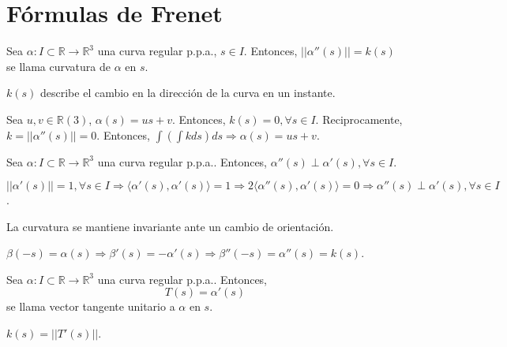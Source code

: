 \section{Fórmulas de Frenet}

\begin{defn}[Curvatura]
  Sea $\alpha : I \subset \mathbb{R} \to \mathbb{R}^{3}$ una curva regular p.p.a., $s \in I$. Entonces, $||\alpha''(s)|| = k(s)$ se llama curvatura de $\alpha$ en $s$.
\end{defn}
 
\begin{obs}
  $k(s)$ describe el cambio en la dirección de la curva en un instante.
\end{obs}

\begin{ejm}
  Sea $u, v \in \mathbb{R}(3)$, $\alpha(s) = us + v$. Entonces, $k(s) = 0, \forall s \in I$. Reciprocamente, $k = ||\alpha''(s)|| = 0$. Entonces, $ \int ( \int k ds) ds \Rightarrow \alpha(s) = us + v$.
\end{ejm}

\begin{prop}
  Sea $\alpha  : I \subset \mathbb{R} \to \mathbb{R}^{3}$ una curva regular p.p.a.. Entonces, $\alpha''(s) \perp \alpha'(s), \forall s \in I$.
\end{prop}

\begin{dem}
  $||\alpha'(s)|| = 1, \forall s \in I \Rightarrow \langle \alpha'(s){ , }\alpha'(s) \rangle = 1 \Rightarrow 2 \langle \alpha''(s){ , }\alpha'(s) \rangle = 0 \Rightarrow \alpha''(s) \perp \alpha'(s), \forall s \in I$.
\end{dem}

\begin{prop}
  La curvatura se mantiene invariante ante un cambio de orientación. 
\end{prop}

\begin{dem}
  $\beta(-s) = \alpha(s) \Rightarrow \beta'(s) = -\alpha'(s) \Rightarrow \beta''(-s) = \alpha''(s) = k(s)$. 
\end{dem}

\begin{defn}
  Sea $\alpha  : I \subset \mathbb{R} \to \mathbb{R}^{3}$ una curva regular p.p.a.. Entonces,
  \[
    T(s) = \alpha'(s) \]
  se llama vector tangente unitario a $\alpha$ en $s$.
\end{defn}

\begin{obs}
  $k(s) = ||T'(s)||$.
\end{obs}

